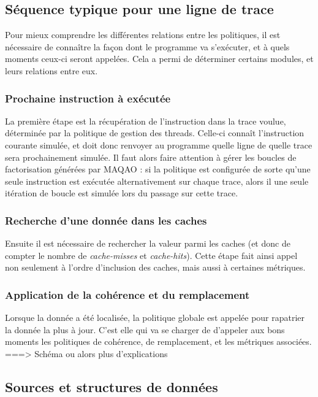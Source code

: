 \subsection{Séquence typique pour une ligne de trace}

Pour mieux comprendre les différentes relations entre les politiques, il est nécessaire de connaître la façon dont le programme va s'exécuter, et à quels moments ceux-ci seront appelées. Cela a permi de déterminer certains modules, et leurs relations entre eux. 

\subsubsection{Prochaine instruction à exécutée}

La première étape est la récupération de l'instruction dans la trace voulue, déterminée par la politique de gestion des threads. Celle-ci connaît l'instruction courante simulée, et doit donc renvoyer au programme quelle ligne de quelle trace sera prochainement simulée. Il faut alors faire attention à gérer les boucles de factorisation générées par \textsc{MAQAO} : si la politique est configurée de sorte qu'une seule instruction est exécutée alternativement sur chaque trace, alors il une seule itération de boucle est simulée lors du passage sur cette trace. 

\subsubsection{Recherche d'une donnée dans les caches}

Ensuite il est nécessaire de rechercher la valeur parmi les caches (et donc de compter le nombre de \emph{cache-misses} et \emph{cache-hits}). Cette étape fait ainsi appel non seulement à l'ordre d'inclusion des caches, mais aussi à certaines métriques.

\subsubsection{Application de la cohérence et du remplacement}

 Lorsque la donnée a été localisée, la politique globale est appelée pour rapatrier la donnée la plus à jour. C'est elle qui va se charger de d'appeler aux bons moments les politiques de cohérence, de remplacement, et les métriques associées. \\
===> Schéma ou alors plus d'explications


\subsection{Sources et structures de données}

